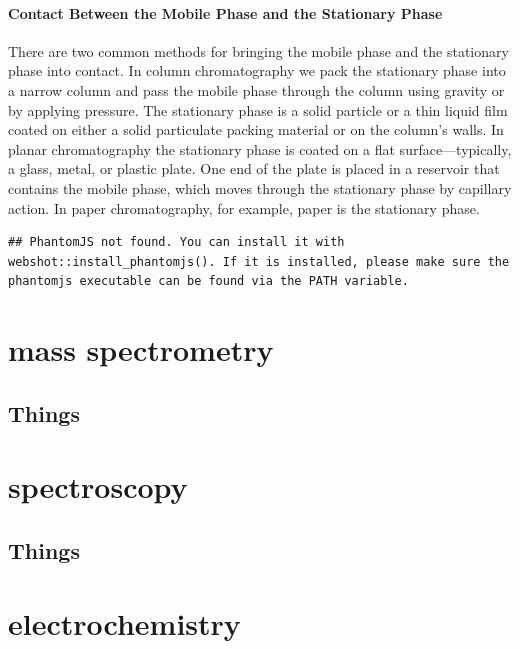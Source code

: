 \documentclass[
]{krantz}
\begin{document}
\hypertarget{contact-between-the-mobile-phase-and-the-stationary-phase}{%
\paragraph{Contact Between the Mobile Phase and the Stationary Phase}\label{contact-between-the-mobile-phase-and-the-stationary-phase}}

There are two common methods for bringing the mobile phase and the stationary phase into contact. In column chromatography we pack the stationary phase into a narrow column and pass the mobile phase through the column using gravity or by applying pressure. The stationary phase is a solid particle or a thin liquid film coated on either a solid particulate packing material or on the column's walls. In planar chromatography the stationary phase is coated on a flat surface---typically, a glass, metal, or plastic plate. One end of the plate is placed in a reservoir that contains the mobile phase, which moves through the stationary phase by capillary action. In paper chromatography, for example, paper is the stationary phase.

\begin{verbatim}
## PhantomJS not found. You can install it with webshot::install_phantomjs(). If it is installed, please make sure the phantomjs executable can be found via the PATH variable.
\end{verbatim}

\hypertarget{mass-spectrometry}{%
\section{mass spectrometry}\label{mass-spectrometry}}

\hypertarget{things}{%
\subsection{Things}\label{things}}

\hypertarget{spectroscopy}{%
\section{spectroscopy}\label{spectroscopy}}

\hypertarget{things-1}{%
\subsection{Things}\label{things-1}}

\hypertarget{electrochemistry}{%
\section{electrochemistry}\label{electrochemistry}}
\end{document}
